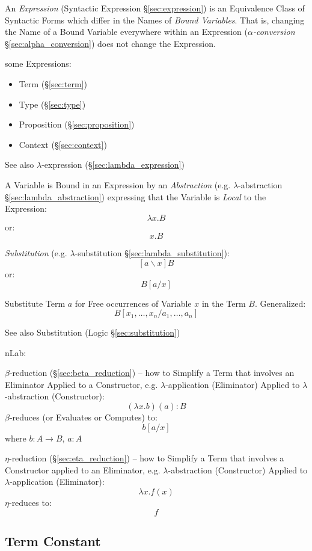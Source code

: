 An \emph{Expression} (Syntactic Expression \S\ref{sec:expression}) is
an Equivalence Class of Syntactic Forms which differ in the Names of
\emph{Bound Variables}. That is, changing the Name of a Bound Variable
everywhere within an Expression (\emph{$\alpha$-conversion}
\S\ref{sec:alpha_conversion}) does not change the Expression.

some Expressions:
\begin{itemize}
  \item Term (\S\ref{sec:term})
  \item Type (\S\ref{sec:type})
  \item Proposition (\S\ref{sec:proposition})
  \item Context (\S\ref{sec:context})
\end{itemize}

\fist See also $\lambda$-expression (\S\ref{sec:lambda_expression})

A Variable is Bound in an Expression by an \emph{Abstraction} (e.g.
$\lambda$-abstraction \S\ref{sec:lambda_abstraction}) expressing that
the Variable is \emph{Local} to the Expression:
\[
  \lambda x.B
\]
or:
\[
  x.B
\]

\emph{Substitution} (e.g. $\lambda$-substitution
\S\ref{sec:lambda_substitution}):
\[
  [a \backslash x]B
\]
or:
\[
  B[a/x]
\]

Substitute Term $a$ for Free occurrences of Variable $x$ in the Term
$B$. Generalized:
\[
  B[x_1,\ldots,x_n / a_1,\ldots,a_n]
\]

\fist See also Substitution (Logic \S\ref{sec:substitution})


\asterism

nLab:

$\beta$-reduction (\S\ref{sec:beta_reduction}) -- how to Simplify a Term
that involves an Eliminator Applied to a Constructor, e.g.
$\lambda$-application (Eliminator) Applied to $\lambda$-abstraction
(Constructor):
\[
  (\lambda x.b)(a):B
\]
$\beta$-reduces (or Evaluates or Computes) to:
\[
  b[a/x]
\]
where $b : A \rightarrow B$, $a:A$

$\eta$-reduction (\S\ref{sec:eta_reduction}) -- how to Simplify a Term
that involves a Constructor applied to an Eliminator, e.g.
$\lambda$-abstraction (Constructor) Applied to $\lambda$-application
(Eliminator):
\[
  \lambda x.f(x)
\]
$\eta$-reduces to:
\[
  f
\]



\subsection{Term Constant}\label{sec:term_constant}

